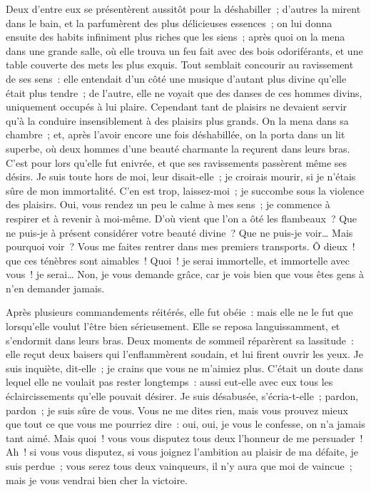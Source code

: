 \documentclass[french,twoside]{book} %
\begin{document}
Deux d’entre eux se présentèrent aussitôt pour la déshabiller ; d’autres la mirent dans le bain, et la parfumèrent des plus délicieuses essences ; on lui donna ensuite des habits infiniment plus riches que les siens ; après quoi on la mena dans une grande salle, où elle trouva un feu fait avec des bois odoriférants, et une table couverte des mets les plus exquis. Tout semblait concourir au ravissement de ses sens : elle entendait d’un côté une musique d’autant plus divine qu’elle était plus tendre ; de l’autre, elle ne voyait que des danses de ces hommes divins, uniquement occupés à lui plaire. Cependant tant de plaisirs ne devaient servir qu’à la conduire insensiblement à des plaisirs plus grands. On la mena dans sa chambre ; et, après l’avoir encore une fois déshabillée, on la porta dans un lit superbe, où deux hommes d’une beauté charmante la reçurent dans leurs bras. C’est pour lors qu’elle fut enivrée, et que ses ravissements passèrent même ses désirs. Je suis toute hors de moi, leur disait-elle ; je croirais mourir, si je n’étais sûre de mon immortalité. C’en est trop, laissez-moi ; je succombe sous la violence des plaisirs. Oui, vous rendez un peu le calme à mes sens ; je commence à respirer et à revenir à moi-même. D’où vient que l’on a ôté les flambeaux ? Que ne puis-je à présent considérer votre beauté divine ? Que ne puis-je voir… Mais pourquoi voir ? Vous me faites rentrer dans mes premiers transports. Ô dieux ! que ces ténèbres sont aimables ! Quoi ! je serai immortelle, et immortelle avec vous ! je serai… Non, je vous demande grâce, car je vois bien que vous êtes gens à n’en demander jamais.\par
Après plusieurs commandements réitérés, elle fut obéie : mais elle ne le fut que lorsqu’elle voulut l’être bien sérieusement. Elle se reposa languissamment, et s’endormit dans leurs bras. Deux moments de sommeil réparèrent sa lassitude : elle reçut deux baisers qui l’enflammèrent soudain, et lui firent ouvrir les yeux. Je suis inquiète, dit-elle ; je crains que vous ne m’aimiez plus. C’était un doute dans lequel elle ne voulait pas rester longtemps : aussi eut-elle avec eux tous les éclaircissements qu’elle pouvait désirer. Je suis désabusée, s’écria-t-elle ; pardon, pardon ; je suis sûre de vous. Vous ne me dites rien, mais vous prouvez mieux que tout ce que vous me pourriez dire : oui, oui, je vous le confesse, on n’a jamais tant aimé. Mais quoi ! vous vous disputez tous deux l’honneur de me persuader ! Ah ! si vous vous disputez, si vous joignez l’ambition au plaisir de ma défaite, je suis perdue ; vous serez tous deux vainqueurs, il n’y aura que moi de vaincue ; mais je vous vendrai bien cher la victoire.\par
\end{document}
